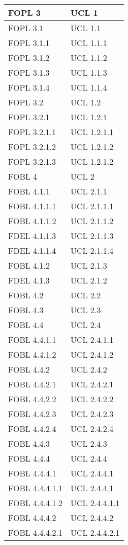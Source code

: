 \begin{longtable}{XX}
FOPL 3&UCL 1\\
\midrule
FOPL 3.1&UCL 1.1\\
\midrule
FOPL 3.1.1&UCL 1.1.1\\
\midrule
FOPL 3.1.2&UCL 1.1.2\\
\midrule
FOPL 3.1.3&UCL 1.1.3\\
\midrule
FOPL 3.1.4&UCL 1.1.4\\
\midrule
FOPL 3.2&UCL 1.2\\
\midrule
FOPL 3.2.1&UCL 1.2.1\\
\midrule
FOPL 3.2.1.1&UCL 1.2.1.1\\
\midrule
FOPL 3.2.1.2&UCL 1.2.1.2\\
\midrule
FOPL 3.2.1.3&UCL 1.2.1.2\\
\midrule
FOBL 4&UCL 2\\
\midrule
FOBL 4.1.1&UCL 2.1.1\\
\midrule
FOBL 4.1.1.1&UCL 2.1.1.1\\
\midrule
FOBL 4.1.1.2&UCL 2.1.1.2\\
\midrule
FDEL 4.1.1.3&UCL 2.1.1.3\\
\midrule
FDEL 4.1.1.4&UCL 2.1.1.4\\
\midrule
FOBL 4.1.2&UCL 2.1.3\\
\midrule
FDEL 4.1.3&UCL 2.1.2\\
\midrule
FOBL 4.2&UCL 2.2\\
\midrule
FOBL 4.3&UCL 2.3\\
\midrule
FOBL 4.4&UCL 2.4\\
\midrule
FOBL 4.4.1.1&UCL 2.4.1.1\\
\midrule
FOBL 4.4.1.2&UCL 2.4.1.2\\
\midrule
FOBL 4.4.2&UCL 2.4.2\\
\midrule
FOBL 4.4.2.1&UCL 2.4.2.1\\
\midrule
FOBL 4.4.2.2&UCL 2.4.2.2\\
\midrule
FOBL 4.4.2.3&UCL 2.4.2.3\\
\midrule
FOBL 4.4.2.4&UCL 2.4.2.4\\
\midrule
FOBL 4.4.3&UCL 2.4.3\\
\midrule
FOBL 4.4.4&UCL 2.4.4\\
\midrule
FOBL 4.4.4.1&UCL 2.4.4.1\\
\midrule
FOBL 4.4.4.1.1&UCL 2.4.4.1\\
\midrule
FOBL 4.4.4.1.2&UCL 2.4.4.1.1\\
\midrule
FOBL 4.4.4.2&UCL 2.4.4.2\\
\midrule
FOBL 4.4.4.2.1&UCL 2.4.4.2.1\\

\end{longtable}
